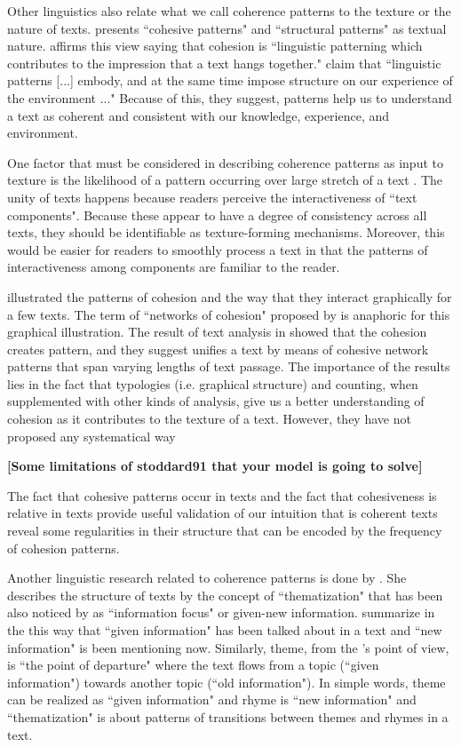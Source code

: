  Other linguistics also relate what we call coherence patterns to the texture or the nature of texts. 
 presents ``cohesive patterns" and ``structural patterns" as textual nature. 
 affirms this view saying that cohesion is ``linguistic patterning which contributes to the impression that a text hangs together."
 claim that ``linguistic patterns  [...] embody, and at the same time impose structure on our experience of the environment ..."
Because of this, they suggest, patterns help us to understand a text as coherent and consistent with our knowledge, experience, and environment. 


One factor that must be considered in describing coherence patterns as input to texture is the likelihood of a pattern occurring over large stretch of a text  . 
The unity of texts happens because readers perceive the interactiveness of ``text components". 
Because these appear to have a degree of consistency across all texts, they should be identifiable as texture-forming mechanisms.
Moreover, this would be easier for readers to smoothly process a text in that the patterns of interactiveness among components are familiar to the reader.  

 illustrated the patterns of cohesion and the way that they interact graphically for a few texts. 
The term of ``networks of cohesion" proposed by  is anaphoric for this graphical illustration. 
The result of text analysis in  showed that the cohesion creates pattern, and they suggest unifies a text by means of cohesive network patterns that span varying lengths of text passage. 
The importance of the results lies in the fact that typologies (i.e. graphical structure) and counting, when supplemented with other kinds of analysis, give us a better understanding of cohesion as it contributes to the texture of a text. 
However, they have not proposed any systematical way 

\textbf{[Some limitations of stoddard91 that your model is going to solve]}

The fact that cohesive patterns occur in texts and the fact that cohesiveness is relative in texts provide useful validation of our intuition that is coherent texts reveal some regularities in their structure that can be encoded by the frequency of cohesion patterns. 

Another linguistic research related to coherence patterns is done by . 
She describes the structure of texts by the concept  of ``thematization" that has been also noticed by  as ``information focus" or given-new information. 
 summarize in the this way that ``given information" has been talked about in a text and ``new information" is been mentioning now.  
Similarly, theme, from the 's point of view, is ``the point of departure" where the text flows from a topic (``given information") towards another topic (``old information"). 
In simple words, theme can be realized as ``given information" and rhyme is ``new information" and ``thematization"  is about  patterns of transitions between themes and rhymes in a text. 

